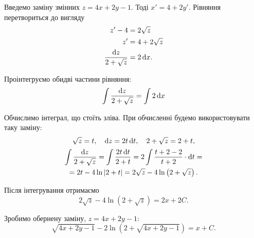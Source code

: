 \begin{solution}
	Введемо заміну змінних $z = 4 x + 2 y - 1$. Тоді $x' = 4 + 2 y'$. Рівняння перетвориться до вигляду 
	\begin{align*} 
		z' - 4 &= 2 \sqrt{z} \\ 
		z' &= 4 + 2 \sqrt{z} \\ 
		\frac{\mathop{}\!\mathrm{d} z}{2 + \sqrt{z}} &= 2 \mathop{}\!\mathrm{d} x.
	\end{align*}

	Проінтегруємо обидві частини рівняння: \[ \int \frac{\mathop{}\!\mathrm{d} z}{2 + \sqrt{z}} = \int 2 \mathop{}\!\mathrm{d} x \] 

	Обчислимо інтеграл, що стоїть зліва. При обчисленні будемо використовувати таку заміну: \[ \sqrt{z} = t, \quad \mathop{}\!\mathrm{d} z = 2 t \mathop{}\!\mathrm{d} t, \quad 2 + \sqrt{z} = 2 + t, \]
	\begin{multline*}
		\int \frac{\mathop{}\!\mathrm{d} z}{2 + \sqrt{z}} = \int \frac{2 t \mathop{}\!\mathrm{d} t}{2 + t} = 2 \int \frac{t + 2 - 2}{t + 2} \cdot \mathop{}\!\mathrm{d} t = \\
		= 2 t - 4 \ln |2 + t| = 2 \sqrt{z} - 4 \ln \left(2 + \sqrt{z}\right).
	\end{multline*}

	Після інтегрування отримаємо \[2 \sqrt{z} - 4 \ln \left(2 + \sqrt{z}\right) = 2 x + 2 C.\]

	Зробимо обернену заміну, $z = 4x + 2y - 1$: \[ \sqrt{4x + 2y - 1} - 2 \ln \left(2 + \sqrt{4x + 2y - 1}\right) = x + C.\]
\end{solution}


